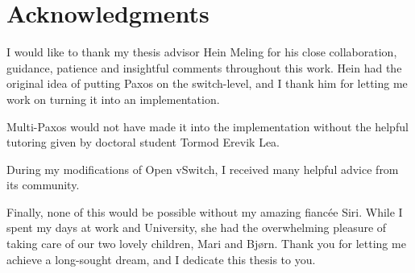 \cleardoublepage%
\chapter*{Acknowledgments}%
\thispagestyle{empty}%

I would like to thank my thesis advisor Hein Meling for his close
collaboration, guidance, patience and insightful comments throughout this
work.
%
Hein had the original idea of putting Paxos on the switch-level, and I thank
him for letting me work on turning it into an implementation.

Multi-Paxos would not have made it into the implementation without the
helpful tutoring given by doctoral student Tormod Erevik Lea.

During my modifications of Open vSwitch, I received many helpful advice from
its community.

Finally, none of this would be possible without my amazing fiancée Siri.
%
While I spent my days at work and University, she had the overwhelming
pleasure of taking care of our two lovely children, Mari and Bjørn.
Thank you for letting me achieve a long-sought dream, and I dedicate this
thesis to you.
